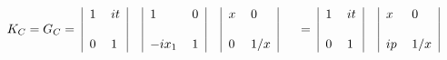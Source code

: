 \begin{equation}\label{Kbose}
\begin{tabular}{c|ll|c|ll|c|ll|c}
  & $1$ & $it$&&$1$&$0$&&$x$&$0$&\\
$K_C=G_C=$&&&&&&&&&\\
  & $0$ &
$1$&&$-ix_1$&$1$&&$0$&$1/x$&\\
\end{tabular}\\
\begin{tabular}{c|ll|c|ll|c}
  & $1$ & $it$&&$x$&$0$&\\
$=$&&&&&&\\
  & $0$ &
$1$&&$ip$&$1/x$&\\
\end{tabular}\\
\end{equation}

